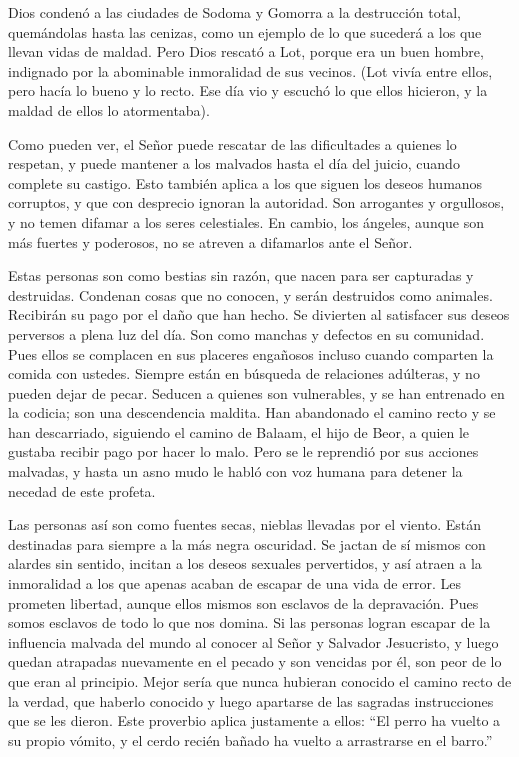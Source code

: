  Dios condenó a las ciudades de Sodoma y Gomorra a la
destrucción total, quemándolas hasta las cenizas, como un ejemplo de lo
que sucederá a los que llevan vidas de maldad.  Pero Dios
rescató a Lot, porque era un buen hombre, indignado por la abominable
inmoralidad de sus vecinos.  (Lot vivía entre ellos, pero
hacía lo bueno y lo recto. Ese día vio y escuchó lo que ellos hicieron,
y la maldad de ellos lo atormentaba).

 Como pueden ver, el Señor puede rescatar de las
dificultades a quienes lo respetan, y puede mantener a los malvados
hasta el día del juicio, cuando complete su castigo.  Esto
también aplica a los que siguen los deseos humanos corruptos, y que con
desprecio ignoran la autoridad. Son arrogantes y orgullosos, y no temen
difamar a los seres celestiales.  En cambio, los ángeles,
aunque son más fuertes y poderosos, no se atreven a difamarlos ante el
Señor.

 Estas personas son como bestias sin razón, que nacen para
ser capturadas y destruidas. Condenan cosas que no conocen, y serán
destruidos como animales.  Recibirán su pago por el daño
que han hecho. Se divierten al satisfacer sus deseos perversos a plena
luz del día. Son como manchas y defectos en su comunidad. Pues ellos se
complacen en sus placeres engañosos incluso cuando comparten la comida
con ustedes.  Siempre están en búsqueda de relaciones
adúlteras, y no pueden dejar de pecar. Seducen a quienes son
vulnerables, y se han entrenado en la codicia; son una descendencia
maldita.  Han abandonado el camino recto y se han
descarriado, siguiendo el camino de Balaam, el hijo de Beor, a quien le
gustaba recibir pago por hacer lo malo.  Pero se le
reprendió por sus acciones malvadas, y hasta un asno mudo le habló con
voz humana para detener la necedad de este profeta.

 Las personas así son como fuentes secas, nieblas llevadas
por el viento. Están destinadas para siempre a la más negra oscuridad.
 Se jactan de sí mismos con alardes sin sentido, incitan a
los deseos sexuales pervertidos, y así atraen a la inmoralidad a los que
apenas acaban de escapar de una vida de error.  Les
prometen libertad, aunque ellos mismos son esclavos de la depravación.
Pues somos esclavos de todo lo que nos domina.  Si las
personas logran escapar de la influencia malvada del mundo al conocer al
Señor y Salvador Jesucristo, y luego quedan atrapadas nuevamente en el
pecado y son vencidas por él, son peor de lo que eran al principio.
 Mejor sería que nunca hubieran conocido el camino recto de
la verdad, que haberlo conocido y luego apartarse de las sagradas
instrucciones que se les dieron.  Este proverbio aplica
justamente a ellos: ``El perro ha vuelto a su propio vómito, y el cerdo
recién bañado ha vuelto a arrastrarse en el barro.''

